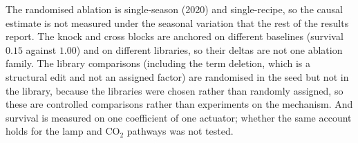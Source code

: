 The randomised ablation is single-season (2020) and single-recipe, so the causal estimate
is not measured under the seasonal variation that the rest of the results report. The
knock and cross blocks are
anchored on different baselines (survival $0.15$ against $1.00$) and on different
libraries, so their deltas are not one ablation family. The library comparisons
(including the term deletion, which is a structural edit and not an assigned factor) are
randomised in the seed but not in the library, because the libraries were chosen rather
than randomly assigned, so these are controlled comparisons rather than experiments on
the mechanism.
And survival is measured on one coefficient of one actuator; whether the same account
holds for the lamp and CO$_2$ pathways was not tested.

